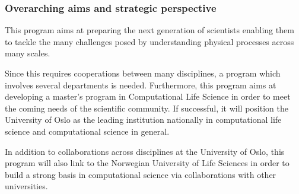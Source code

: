 \documentclass{beamer}
\begin{document}
\begin{frame}
\frametitle{Overarching aims and strategic perspective}

\begin{block}{}

This program aims  at preparing the next generation of scientists enabling them to tackle the many challenges posed by understanding physical processes across many scales. 

Since this requires cooperations between many disciplines, a program
which involves several departments is needed. Furthermore, this
program aims at developing a master's program in Computational Life
Science in order to meet the coming needs of the scientific community. If successful, it will
position the University of Oslo as the leading institution
nationally in computational life science and computational science in general. 

In addition to collaborations across disciplines at the University of Oslo, 
this program will also link to the Norwegian University of Life Sciences 
in order to build a strong basis in computational science via collaborations with other universities.

\end{block}
\end{frame}
\end{document}
